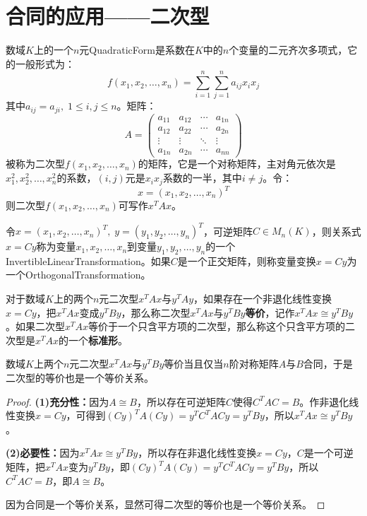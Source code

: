 \section{合同的应用——二次型}
\begin{definition}
	数域$K$上的一个$n$元\gls{QuadraticForm}是系数在$K$中的$n$个变量的二元齐次多项式，它的一般形式为：
	\begin{equation*}
		f(x_1,x_2,\dots,x_n)=\sum_{i=1}^{n}\sum_{j=1}^{n}a_{ij}x_ix_j
	\end{equation*}
	其中$a_{ij}=a_{ji},\;1\leqslant i,j\leqslant n$。矩阵：
	\begin{equation*}
		A=
		\begin{pmatrix}
			a_{11} & a_{12} & \cdots & a_{1n} \\
			a_{12} & a_{22} & \cdots & a_{2n} \\
			\vdots & \vdots & \ddots & \vdots \\
			a_{1n} & a_{2n} & \cdots & a_{nn}
		\end{pmatrix}
	\end{equation*}
	被称为二次型$f(x_1,x_2,\dots,x_n)$的矩阵，它是一个对称矩阵，主对角元依次是$x_1^2,x_2^2,\dots,x_n^2$的系数，$(i,j)$元是$x_ix_j$系数的一半，其中$i\ne j$。令：
	\begin{equation*}
		x=(x_1,x_2,\dots,x_n)^T
	\end{equation*}
	则二次型$f(x_1,x_2,\dots,x_n)$可写作$x^TAx$。
\end{definition}
\begin{definition}
	令$x=(x_1,x_2,\dots,x_n)^T,\;y=(y_1,y_2,\dots,y_n)^T$，可逆矩阵$C\in M_{n}(K)$，则关系式$x=Cy$称为变量$x_1,x_2,\dots,x_n$到变量$y_1,y_2,\dots,y_n$的一个\gls{InvertibleLinearTransformation}。如果$C$是一个正交矩阵，则称变量变换$x=Cy$为一个\gls{OrthogonalTransformation}。
\end{definition}
\begin{definition}
	对于数域$K$上的两个$n$元二次型$x^TAx$与$y^TAy$，如果存在一个非退化线性变换$x=Cy$，把$x^TAx$变成$y^TBy$，那么称二次型$x^TAx$与$y^TBy$\textbf{等价}，记作$x^TAx\cong y^TBy$。如果二次型$x^TAx$等价于一个只含平方项的二次型，那么称这个只含平方项的二次型是$x^TAx$的一个\textbf{标准形}。
\end{definition}
\begin{theorem}\label{theo:QuadraticEquivCongruent}
	数域$K$上两个$n$元二次型$x^TAx$与$y^TBy$等价当且仅当$n$阶对称矩阵$A$与$B$合同，于是二次型的等价也是一个等价关系。
\end{theorem}
\begin{proof}
	\textbf{(1)充分性：}因为$A\cong B$，所以存在可逆矩阵$C$使得$C^TAC=B$。作非退化线性变换$x=Cy$，可得到$(Cy)^TA(Cy)=y^TC^TACy=y^TBy$，所以$x^TAx\cong y^TBy$。\par
	\textbf{(2)必要性：}因为$x^TAx\cong y^TBy$，所以存在非退化线性变换$x=Cy$，$C$是一个可逆矩阵，把$x^TAx$变为$y^TBy$，即$(Cy)^TA(Cy)=y^TC^TACy=y^TBy$，所以$C^TAC=B$，即$A\cong B$。\par
	因为合同是一个等价关系，显然可得二次型的等价也是一个等价关系。
\end{proof}
